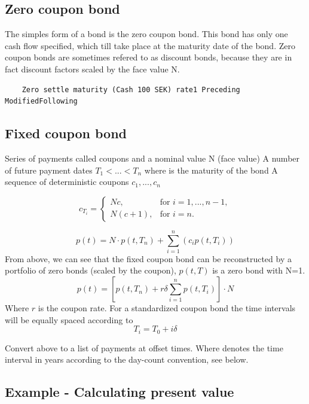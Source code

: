 \documentclass[11pt,a4paper]{article}
\numberwithin{equation}{section}
\begin{document}
	\label{sec:fi}

	\subsection{Zero coupon bond}
	The simples form of a bond is the zero coupon bond. This bond has only one cash flow specified, which till take place at the maturity date of the bond. Zero coupon bonds are sometimes refered to as discount bonds, because they are in fact discount factors scaled by the face value N.

	\FrameSep
	\begin{lstlisting}
	Zero settle maturity (Cash 100 SEK) rate1 Preceding ModifiedFollowing
	\end{lstlisting}
	\FrameSep


	\subsection{Fixed coupon bond}
	Series of payments called coupons and a nominal value N (face value)
	A number of future payment dates $T_1 < ... < T_n$ where is the maturity of the bond
	A sequence of deterministic coupons $c_1, ..., c_n$

	\[ c_{T_i} = \left\{
	\begin{array}{ll}
	  Nc, & \text{for } i=1,...,n-1,  \\
	  N(c+1), &\text{for } i=n.
	\end{array} \right.\]

	\[
	p(t) = N \cdot p(t,T_n)+\sum_{i=1}^{n} (c_ip(t,T_i))
	\]
	From above, we can see that the fixed coupon bond can be reconstructed by a portfolio of zero
	bonds (scaled by the coupon), $p(t,T)$ is a zero bond with N=1.
	\[
	p(t)=\left[p(t,T_n)+r\delta\sum_{i=1}^{n} p(t,T_i)\right]\cdot N
	\]
	Where $r$ is the coupon rate. For a standardized coupon bond the time intervals will be equally
	spaced according to
	\[
	T_i=T_0+i\delta
	\]

	Convert above to a list of payments at offset times. Where denotes the time interval in years
	according to the day-count convention, see below.

	\subsection{Example - Calculating present value}

\end{document}
